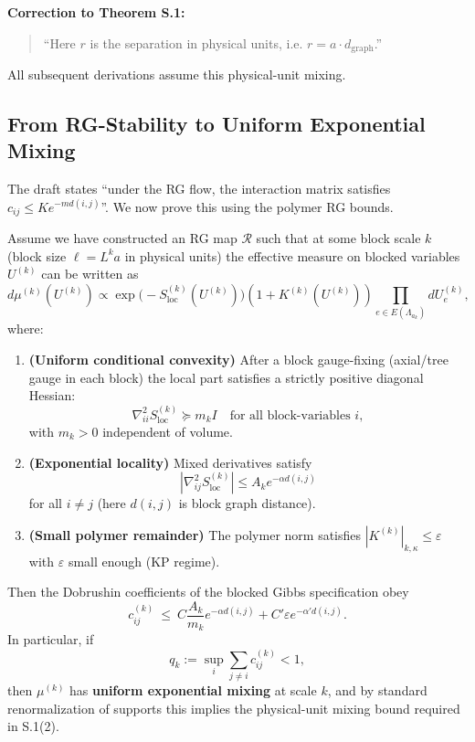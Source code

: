 \textbf{Correction to Theorem S.1:}
\begin{quote}
``Here $r$ is the separation in physical units, i.e. $r=a \cdot d_{\text{graph}}$.''
\end{quote}
All subsequent derivations assume this physical-unit mixing.

\subsection{From RG-Stability to Uniform Exponential Mixing}

The draft states ``under the RG flow, the interaction matrix satisfies $c_{ij}\le K e^{-m d(i,j)}$''. We now prove this using the polymer RG bounds.

\begin{theorem}
\label{thm:rg_dobrushin_mixing}
Assume we have constructed an RG map $\mathcal{R}$ such that at some block scale $k$ (block size $\ell=L^k a$ in physical units) the effective measure on blocked variables $U^{(k)}$ can be written as
\begin{equation}
d\mu^{(k)}(U^{(k)}) \propto \exp\bigl(-S^{(k)}_{\mathrm{loc}}(U^{(k)})\bigr)(1+K^{(k)}(U^{(k)}))\prod_{e\in E(\Lambda_{a_k})}dU^{(k)}_e,
\end{equation}
where:
\begin{enumerate}
    \item \textbf{(Uniform conditional convexity)} After a block gauge-fixing (axial/tree gauge in each block) the local part satisfies a strictly positive diagonal Hessian:
    \begin{equation}
    \nabla^2_{ii}S^{(k)}_{\mathrm{loc}} \succeq m_k I
    \quad\text{for all block-variables }i,
    \end{equation}
    with $m_k>0$ independent of volume.

    \item \textbf{(Exponential locality)} Mixed derivatives satisfy
    \begin{equation}
    |\nabla^2_{ij}S^{(k)}_{\mathrm{loc}}|\le A_k e^{-\alpha d(i,j)}
    \end{equation}
    for all $i\ne j$ (here $d(i,j)$ is block graph distance).

    \item \textbf{(Small polymer remainder)} The polymer norm satisfies $|K^{(k)}|_{k,\kappa}\le \varepsilon$ with $\varepsilon$ small enough (KP regime).
\end{enumerate}

Then the Dobrushin coefficients of the blocked Gibbs specification obey
\begin{equation}
c^{(k)}_{ij}\ \le\ C\frac{A_k}{m_k}e^{-\alpha d(i,j)} + C'\varepsilon e^{-\alpha' d(i,j)}.
\end{equation}
In particular, if
\begin{equation}
q_k:=\sup_i \sum_{j\ne i} c^{(k)}_{ij}<1,
\end{equation}
then $\mu^{(k)}$ has \textbf{uniform exponential mixing} at scale $k$, and by standard renormalization of supports this implies the physical-unit mixing bound required in S.1(2).
\end{theorem}

